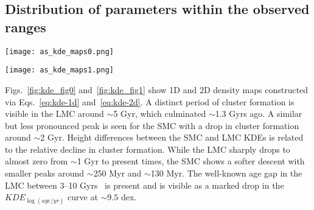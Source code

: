 \documentclass{aa}
\begin{document}

\subsection{Distribution of parameters within the observed ranges}
\label{ssec:dist_ranges}

\begin{figure*}
\texttt{[image: as\_kde\_maps0.png]}
\caption{Adaptive Gaussian KDEs for age, metallicity, and mass. The top and right
plots are 1D KDEs; center plots are 2D KDEs. Observed clusters are plotted as
red and blue stars for the S/LMC, respectively. Sizes are scaled according to
the radius of each cluster. A small scatter is introduced for clarity.}
\label{fig:kde_fig0}
\end{figure*}

\begin{figure*}
\texttt{[image: as\_kde\_maps1.png]}
\caption{Same as Fig.~\ref{fig:kde_fig0} for $E_{(B-V)}$ and distance
modulus.}
\label{fig:kde_fig1}
\end{figure*}

Figs.~\ref{fig:kde_fig0} and~\ref{fig:kde_fig1} show 1D and 2D density maps
constructed via Eqs.~\ref{eq:kde-1d} and~\ref{eq:kde-2d}.
%
%
A distinct period of cluster formation is visible in the LMC around ${\sim}$5
Gyr, which culminated ${\sim}$1.3 Gyrs ago. A similar but less
pronounced peak is seen for the SMC with a drop in cluster formation around
${\sim}$2 Gyr.
Height differences between the SMC and LMC KDEs is related to the relative
decline in cluster formation. While the LMC sharply drops to almost zero from
${\sim}$1 Gyr to present times, the SMC shows a softer descent with smaller
peaks around ${\sim}$250 Myr and ${\sim}$130 Myr.
The well-known age gap in the LMC between 3--10 Gyrs~\citep{Balbinot_2010}
is present and is visible as a marked drop in the $KDE_{\log(age/yr)}$ curve at
$\sim9.5$ dex.
\end{document}

